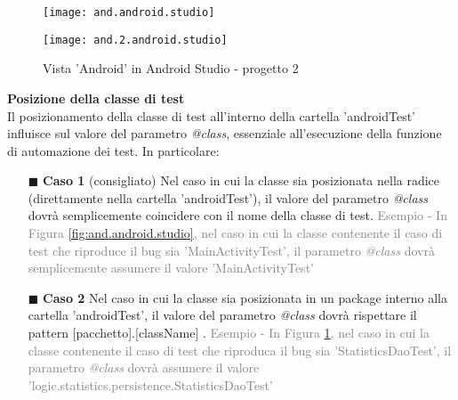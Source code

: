 \begin{figure}[H]
    \centering
    \begin{minipage}{0.4\textwidth}
        \centering
        \texttt{[image: and.android.studio]} 
        \caption{Vista 'Android' in Android Studio - progetto 1}
            \label{fig:and.android.studio}
    \end{minipage}\hfill
    \begin{minipage}{0.5\textwidth}
        \centering
        \texttt{[image: and.2.android.studio]} 
        \caption{Vista 'Android' in Android Studio - progetto 2}
            \label{fig:and.2.android.studio}
    \end{minipage}\hfill
\end{figure}

\bigskip
\noindent\textbf{Posizione della classe di test} \\
Il posizionamento della classe di test all'interno della cartella 'androidTest' influisce sul valore del parametro \emph{@class}, essenziale all'esecuzione della funzione di automazione dei test. In particolare:
\begin{itemize} [nosep]
\item [$\blacksquare$] \textbf{Caso 1} (consigliato) \newline
Nel caso in cui la classe sia posizionata nella radice (direttamente nella cartella 'androidTest'), il valore del parametro \emph{@class} dovrà semplicemente coincidere con il nome della classe di test.  \newline
\textcolor{gray}{Esempio - In Figura \ref{fig:and.android.studio}, nel caso in cui la classe contenente il caso di test che riproduce il bug sia 'MainActivityTest', il parametro \emph{@class} dovrà semplicemente assumere il valore 'MainActivityTest' }
\item [$\blacksquare$] \textbf{Caso 2} \newline
Nel caso in cui la classe sia posizionata in un package interno alla cartella 'androidTest', il valore del parametro \emph{@class} dovrà rispettare il pattern [pacchetto].[className] .  \newline
\textcolor{gray}{Esempio - In Figura \ref{fig:and.2.android.studio}, nel caso in cui la classe contenente il caso di test che riproduca il bug sia 'StatisticsDaoTest', il parametro \emph{@class} dovrà assumere il valore 'logic.statistics.persistence.StatisticsDaoTest' }
\end{itemize}

